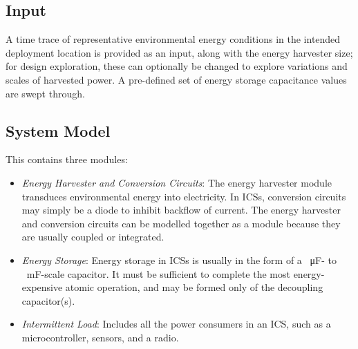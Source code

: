 \subsection{Input}
A time trace of representative environmental energy conditions in the intended deployment location is provided as an input, along with the energy harvester size; for design exploration, these can optionally be changed to explore variations and scales of harvested power. A pre-defined set of energy storage capacitance values are swept through. 

\subsection{System Model}

This contains three modules:
\begin{itemize}
    \item \textit{Energy Harvester and Conversion Circuits}: The energy harvester module transduces environmental energy into electricity. 
    In ICSs, conversion circuits may simply be a diode to inhibit backflow of current.
    The energy harvester and conversion circuits can be modelled together as a module because they are usually coupled or integrated. 
    \item \textit{Energy Storage}: Energy storage in ICSs is usually in the form of a \SI{}{\micro\farad}-  to \SI{}{\milli\farad}-scale capacitor. It must be sufficient to complete the most energy-expensive atomic operation, and may be formed only of the decoupling capacitor(s). 
    \item \textit{Intermittent Load}: Includes all the power consumers in an ICS, such as a microcontroller, sensors, and a radio. 
\end{itemize}

